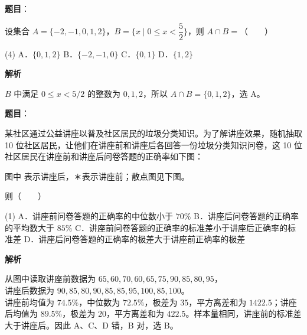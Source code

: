 


\begin{answer}

\textbf{题目}：

设集合 $A=\{-2,-1,0,1,2\}$，$B=\{x\mid 0\leq x<\dfrac52\}$，则 $A\cap B=$\mbox{（　　）}

\begin{gkopts}(4)
\task A．$\{0,1,2\}$
\task B．$\{-2,-1,0\}$
\task C．$\{0,1\}$
\task D．$\{1,2\}$
\end{gkopts}

\textbf{解析}

$B$ 中满足 $0\leq x<5/2$ 的整数为 $0,1,2$，所以 $A\cap B=\{0,1,2\}$，选 A。


\end{answer}
\begin{answer}

\textbf{题目}：

某社区通过公益讲座以普及社区居民的垃圾分类知识。为了解讲座效果，随机抽取 10 位社区居民，让他们在讲座前和讲座后各回答一份垃圾分类知识问卷，这 10 位社区居民在讲座前和讲座后问卷答题的正确率如下图：

图中 \textbullet{} 表示讲座后，＊表示讲座前；散点图见下图。
\nopagebreak[4]
\begin{center}\end{center}
\nopagebreak[4]
则\mbox{（　　）}

\begin{gkopts}(1)
\task A．讲座前问卷答题的正确率的中位数小于 $70\%$
\task B．讲座后问卷答题的正确率的平均数大于 $85\%$
\task C．讲座前问卷答题的正确率的标准差小于讲座后正确率的标准差
\task D．讲座后问卷答题的正确率的极差大于讲座前正确率的极差
\end{gkopts}

\textbf{解析}

从图中读取讲座前数据为 $65,60,70,60,65,75,90,85,80,95$，\\
讲座后数据为 $90,85,80,90,85,85,95,100,85,100$。\\
讲座前均值为 $74.5\%$，中位数为 $72.5\%$，极差为 $35$，平方离差和为 $1422.5$；讲座后均值为 $89.5\%$，极差为 $20$，平方离差和为 $422.5$。样本量相同，讲座前的标准差大于讲座后。因此 A、C、D 错，B 对，选 B。


\end{answer}

